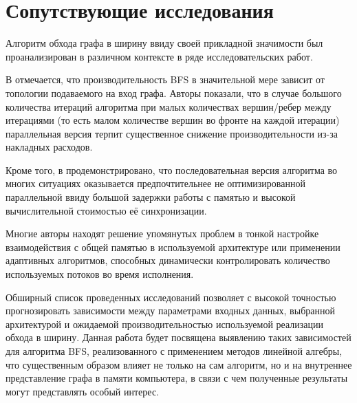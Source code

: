
\section{Сопутствующие исследования}
\label{sec:relatedworks}
Алгоритм обхода графа в ширину ввиду своей прикладной значимости был проанализирован в различном контексте в ряде исследовательских работ. 

В \cite{adaptiveBFS} отмечается, что производительность BFS в значительной мере зависит от топологии подаваемого на вход графа. Авторы показали, что в случае большого количества итераций алгоритма при малых количествах вершин/ребер между итерациями (то есть малом количестве вершин во фронте на каждой итерации) параллельная версия терпит существенное снижение производительности из-за накладных расходов.

Кроме того, в \cite{scalableBFS} продемонстрировано, что последовательная версия алгоритма во многих ситуациях оказывается предпочтительнее не оптимизированной параллельной ввиду большой задержки работы с памятью и высокой вычислительной стоимостью её синхронизации. 

Многие авторы находят решение упомянутых проблем в тонкой настройке взаимодействия с общей памятью в используемой архитектуре или применении адаптивных алгоритмов, способных динамически контролировать количество используемых потоков во время исполнения.

Обширный список проведенных исследований позволяет с высокой точностью прогнозировать зависимости между параметрами входных данных, выбранной архитектурой и ожидаемой производительностью используемой реализации обхода в ширину. Данная работа будет посвящена выявлению таких зависимостей для алгоритма BFS, реализованного с применением методов линейной алгебры, что существенным образом влияет не только на сам алгоритм, но и на внутреннее представление графа в памяти компьютера, в связи с чем полученные результаты могут представлять особый интерес.
